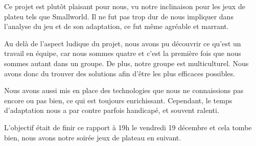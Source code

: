 Ce projet est plutôt plaisant pour nous, vu notre inclinaison pour les jeux de plateu tels que Smallworld\up{\copyright}. Il ne fut pas trop dur de nous impliquer dans l'analyse du jeu et de son adaptation, ce fut même agréable et marrant.
	
	Au delà de l'aspect ludique du projet, nous avons pu découvrir ce qu'est un travail en équipe, car nous sommes quatre et c'est la première fois que nous sommes autant dans un groupe. De plus, notre groupe est multiculturel. Nous avons donc du trouver des solutions afin d'être les plus efficaces possibles.
	
	Nous avons aussi mis en place des technologies que nous ne connaissions pas encore ou pas bien, ce qui est toujours enrichissant. Cependant, le temps d'adaptation nous a par contre parfois handicapé, et souvent ralenti.
	
	L'objectif était de finir ce rapport à 19h le vendredi 19 décembre et cela tombe bien, nous avons notre soirée jeux de plateau en suivant. 